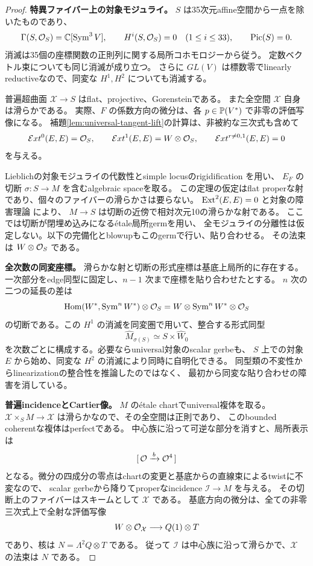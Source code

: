 \begin{proof}
\textbf{特異ファイバー上の対象モジュライ。}
$S$ は35次元affine空間から一点を除いたものであり、
\begin{equation}\label{eq:universal-bn-base-vanishing}
 \Gamma(S,\mathcal O_S)=\mathbb C[\operatorname{Sym}^3V],\qquad
 H^i(S,\mathcal O_S)=0\quad(1\le i\le33),\qquad \operatorname{Pic}(S)=0.
\end{equation}
消滅は35個の座標関数の正則列に関する局所コホモロジーから従う。
定数ベクトル束についても同じ消滅が成り立つ。
さらに $GL(V)$ は標数零でlinearly reductiveなので、同変な
$H^1,H^2$ についても消滅する。

普遍超曲面 $\mathcal X\to S$ はflat、projective、Gorensteinである。
また全空間 $\mathcal X$ 自身は滑らかである。
実際、$F$ の係数方向の微分は、各 $p\in\mathbb P(V^*)$ で非零の評価写像になる。
補題\ref{lem:universal-tangent-lift}の計算は、非被約な三次式も含めて
\[
 \mathcal E xt^0(E,E)=\mathcal O_S,\qquad
 \mathcal E xt^1(E,E)=W\otimes\mathcal O_S,
 \qquad \mathcal E xt^{r\ne0,1}(E,E)=0
\]
を与える。

Lieblichの対象モジュライの代数性とsimple locusのrigidification
\cite[Theorem 4.2.1, Corollary 4.3.3]{LieblichComplexes}を用い、
$E_F$ の切断 $\sigma:S\to M$ を含むalgebraic spaceを取る。
この定理の仮定はflat properな射であり、個々のファイバーの滑らかさは要らない。
$\operatorname{Ext}^2(E,E)=0$ と対象の障害理論
\cite[Theorem 3.1.1, Corollary 3.1.2]{LieblichComplexes}により、
$M\to S$ は切断の近傍で相対次元10の滑らかな射である。
ここでは切断が閉埋め込みになる\'etale局所germを用い、
全モジュライの分離性は仮定しない。以下の完備化とblowupもこのgermで行い、貼り合わせる。
その法束は $W\otimes\mathcal O_S$ である。

\textbf{全次数の同変座標。}
滑らかな射と切断の形式座標は基底上局所的に存在する。
一次部分をedge同型に固定し、$n-1$ 次まで座標を貼り合わせたとする。
$n$ 次の二つの延長の差は
\[
 \operatorname{Hom}(W^*,\operatorname{Sym}^nW^*)\otimes\mathcal O_S
       =W\otimes\operatorname{Sym}^nW^*\otimes\mathcal O_S
\]
の切断である。この $H^1$ の消滅を同変圏で用いて、整合する形式同型
\[
                   \widehat M_{\sigma(S)}\simeq S\times\widehat W_0
\]
を次数ごとに構成する。必要ならuniversal対象のscalar gerbeも、
$S$ 上での対象 $E$ から始め、同変な $H^2$ の消滅により同時に自明化できる。
同型類の不変性からlinearizationの整合性を推論したのではなく、
最初から同変な貼り合わせの障害を消している。

\textbf{普遍incidenceとCartier像。}
$M$ の\'etale chartでuniversal複体を取る。
$\mathcal X\times_SM\to\mathcal X$ は滑らかなので、その全空間は正則であり、
このbounded coherentな複体はperfectである。
中心族に沿って可逆な部分を消すと、局所表示は
\[
                       [\,\mathcal O\xrightarrow{\,b\,}\mathcal O^4\,]
\]
となる。微分の四成分の零点はchartの変更と基底からの直線束によるtwistに不変なので、
scalar gerbeから降りてproperなincidence $\mathcal I\to M$ を与える。
その切断上のファイバーはスキームとして $\mathcal X$ である。
基底方向の微分は、全ての非零三次式上で全射な評価写像
\[
 W\otimes\mathcal O_{\mathcal X}\longrightarrow Q(1)\otimes T
\]
であり、核は $N=\Lambda^2Q\otimes T$ である。
従って $\mathcal I$ は中心族に沿って滑らかで、$\mathcal X$ の法束は $N$ である。


\end{proof}
